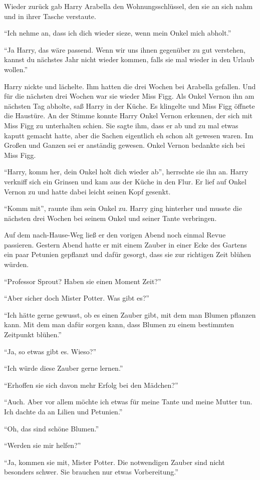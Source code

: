Wieder zurück gab Harry Arabella den Wohnungsschlüssel, den sie an sich nahm und in ihrer Tasche verstaute.

\enquote{Ich nehme an, dass ich dich wieder sieze, wenn mein Onkel mich abholt.}

\enquote{Ja Harry, das wäre passend. Wenn wir uns ihnen gegenüber zu gut verstehen, kannst du nächstes Jahr nicht wieder kommen, falls sie mal wieder in den Urlaub wollen.}

Harry nickte und lächelte. Ihm hatten die drei Wochen bei Arabella gefallen. Und für die nächsten drei Wochen war sie wieder Miss Figg. Als Onkel Vernon ihn am nächsten Tag abholte, saß Harry in der Küche. Es klingelte und Miss Figg öffnete die Haustüre. An der Stimme konnte Harry Onkel Vernon erkennen, der sich mit Miss Figg zu unterhalten schien. Sie sagte ihm, dass er ab und zu mal etwas kaputt gemacht hatte, aber die Sachen eigentlich eh schon alt gewesen waren. Im Großen und Ganzen sei er anständig gewesen. Onkel Vernon bedankte sich bei Miss Figg.

\enquote{Harry, komm her, dein Onkel holt dich wieder ab}, herrschte sie ihn an. Harry verkniff sich ein Grinsen und kam aus der Küche in den Flur. Er lief auf Onkel Vernon zu und hatte dabei leicht seinen Kopf gesenkt.

\enquote{Komm mit}, raunte ihm sein Onkel zu. Harry ging hinterher und musste die nächsten drei Wochen bei seinem Onkel und seiner Tante verbringen.

Auf dem nach-Hause-Weg ließ er den vorigen Abend noch einmal Revue passieren. Gestern Abend hatte er mit einem Zauber in einer Ecke des Gartens ein paar Petunien gepflanzt und dafür gesorgt, dass sie zur richtigen Zeit blühen würden.

\begin{rueckblick}
\enquote{Professor Sprout? Haben sie einen Moment Zeit?}

\enquote{Aber sicher doch Mister Potter. Was gibt es?}

\enquote{Ich hätte gerne gewusst, ob es einen Zauber gibt, mit dem man Blumen pflanzen kann. Mit dem man dafür sorgen kann, dass Blumen zu einem bestimmten Zeitpunkt blühen.}

\enquote{Ja, so etwas gibt es. Wieso?}

\enquote{Ich würde diese Zauber gerne lernen.}

\enquote{Erhoffen sie sich davon mehr Erfolg bei den Mädchen?}

\enquote{Auch. Aber vor allem möchte ich etwas für meine Tante und meine Mutter tun. Ich dachte da an Lilien und Petunien.}

\enquote{Oh, das sind schöne Blumen.}

\enquote{Werden sie mir helfen?}

\enquote{Ja, kommen sie mit, Mister Potter. Die notwendigen Zauber sind nicht besonders schwer. Sie brauchen nur etwas Vorbereitung.}
\end{rueckblick}

